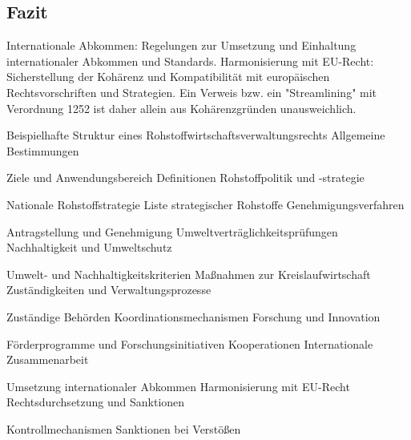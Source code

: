 \documentclass[12pt,a4paper,oneside]{book} %
\begin{document}
\subsection{Fazit}



Internationale Abkommen: Regelungen zur Umsetzung und Einhaltung internationaler Abkommen und Standards.
Harmonisierung mit EU-Recht: Sicherstellung der Kohärenz und Kompatibilität mit europäischen Rechtsvorschriften und Strategien.
Ein Verweis bzw. ein "Streamlining" mit Verordnung 1252 ist daher allein aus Kohärenzgründen unausweichlich.

Beispielhafte Struktur eines Rohstoffwirtschaftsverwaltungsrechts
Allgemeine Bestimmungen

Ziele und Anwendungsbereich
Definitionen
Rohstoffpolitik und -strategie

Nationale Rohstoffstrategie
Liste strategischer Rohstoffe
Genehmigungsverfahren

Antragstellung und Genehmigung
Umweltverträglichkeitsprüfungen
Nachhaltigkeit und Umweltschutz

Umwelt- und Nachhaltigkeitskriterien
Maßnahmen zur Kreislaufwirtschaft
Zuständigkeiten und Verwaltungsprozesse

Zuständige Behörden
Koordinationsmechanismen
Forschung und Innovation

Förderprogramme und Forschungsinitiativen
Kooperationen
Internationale Zusammenarbeit

Umsetzung internationaler Abkommen
Harmonisierung mit EU-Recht
Rechtsdurchsetzung und Sanktionen

Kontrollmechanismen
Sanktionen bei Verstößen
\end{document}

